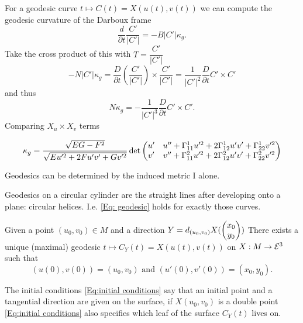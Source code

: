 \begin{remark}
	
	For a geodesic curve $ t \mapsto C(t) = X(u(t),v(t)) $ we can compute the geodesic curvature of the Darboux frame
		\[ \dfrac{d}{\partial t} \dfrac{C'}{|C'|} = - B |C'|\kappa_g. \]
	Take the cross product of this with $ T = \dfrac{C'}{|C'|} $
		\[ - N |C'|\kappa_g = \dfrac{D}{\partial t}(\dfrac{C'}{|C'|}) \times \dfrac{C'}{|C'|} = \dfrac{1}{|C'|^2} \dfrac{D}{\partial t}C' \times C' \] and thus
		\[ N\kappa_g = - \dfrac{1}{|C'|^3}\dfrac{D}{\partial t} C' \times C'. \]
		Comparing $ X_u \times X_v $ terms
		
		\[ \kappa_g = \frac {\sqrt{EG-F^2}}{\sqrt{Eu'^2+2Fu'v'+Gv'^2}} \det \begin{pmatrix} 
			u' & u'' + \Gamma_{11}^1 u'^2 + 2\Gamma_{12}^1u'v' + \Gamma_{22}^1v'^2\\
			v' & v'' + \Gamma_{11}^2 u'^2 + 2\Gamma_{12}^2u'v' + \Gamma_{22}^2v'^2 \end{pmatrix}
		\]
		
	
\end{remark}

\begin{corollary}
	Geodesics can be determined by the induced metric $ \mathrm{I} $ alone.
\end{corollary}

\begin{example}
	
	Geodesics on a circular cylinder are the straight lines after developing onto a plane: circular helices.
	I.e. \ref{Eq: geodesic} holds for exactly those curves.
	
\end{example}

\begin{corollary}
	
	Given a point $ (u_0,v_0) \in M $ and a direction $ Y = d_{(u_0,v_0)}X(\begin{pmatrix} x_0 \\ y_0 \end{pmatrix})  $
	There exists a unique (maximal) geodesic $ t \mapsto C_Y(t) = X(u(t),v(t)) $ on $ X: M \rightarrow \mathcal E^3 $ such that
		\[ (u(0),v(0)) = (u_0,v_0) \text{ and } (u'(0),v'(0)) = (x_0,y_0) \label{Eq:initial conditions}. \]
	
\end{corollary}

\begin{remark}
	
	The initial conditions \ref{Eq:initial conditions} say that an initial point and a tangential direction are given on the surface, if $ X(u_0,v_0) $ is a double point \ref{Eq:initial conditions} also specifies which leaf of the surface $ C_Y(t) $ lives on.
	
\end{remark}

